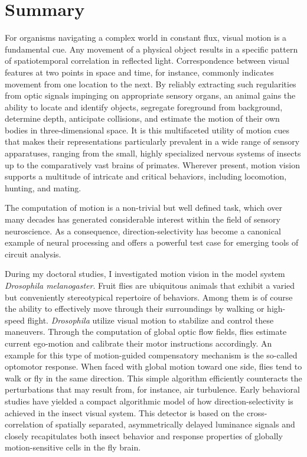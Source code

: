 
\chapter*{Summary}
\label{chp:summary}

For organisms navigating a complex world in constant flux, visual motion is a fundamental cue. Any movement of a physical object results in a specific pattern of spatiotemporal correlation in reflected light. Correspondence between visual features at two points in space and time, for instance, commonly indicates movement from one location to the next. By reliably extracting such regularities from optic signals impinging on appropriate sensory organs, an animal gains the ability to locate and identify objects, segregate foreground from background, determine depth, anticipate collisions, and estimate the motion of their own bodies in three-dimensional space. It is this multifaceted utility of motion cues that makes their representations particularly prevalent in a wide range of sensory apparatuses, ranging from the small, highly specialized nervous systems of insects up to the comparatively vast brains of primates. Wherever present, motion vision supports a multitude of intricate and critical behaviors, including locomotion, hunting, and mating.

The computation of motion is a non-trivial but well defined task, which over many decades has generated considerable interest within the field of sensory neuroscience. As a consequence, direction-selectivity has become a canonical example of neural processing and offers a powerful test case for emerging tools of circuit analysis.

During my doctoral studies, I investigated motion vision in the model system \textit{Drosophila melanogaster}. Fruit flies are ubiquitous animals that exhibit a varied but conveniently stereotypical repertoire of behaviors. Among them is of course the ability to effectively move through their surroundings by walking or high-speed flight. \textit{Drosophila} utilize visual motion to stabilize and control these maneuvers. Through the computation of global optic flow fields, flies estimate current ego-motion and calibrate their motor instructions accordingly. An example for this type of motion-guided compensatory mechanism is the so-called optomotor response. When faced with global motion toward one side, flies tend to walk or fly in the same direction. This simple algorithm efficiently counteracts the perturbations that may result from, for instance, air turbulence. Early behavioral studies have yielded a compact algorithmic model of how direction-selectivity is achieved in the insect visual system. This detector is based on the cross-correlation of spatially separated, asymmetrically delayed luminance signals and closely recapitulates both insect behavior and response properties of globally motion-sensitive cells in the fly brain.

